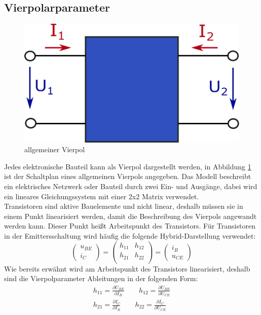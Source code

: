\documentclass[12pt,a4paper,ngerman]{report}
\begin{document}
		\subsection{Vierpolarparameter}
				\begin{figure}[h]
			\centering
			\includegraphics[width=7.5 cm]{plots/Vierpol.pdf}
			\caption{allgemeiner Vierpol}
			\label{img:Vierpol}
		\end{figure} 
		Jedes elektronische Bauteil kann als Vierpol dargestellt werden, in Abbildung \ref{img:Vierpol} ist der Schaltplan eines allgemeinen Vierpols angegeben. Das Modell beschreibt ein elektrisches Netzwerk oder Bauteil durch zwei Ein- und Ausgänge, dabei wird ein lineares Gleichungssystem mit einer 2x2 Matrix verwendet.\\
		Transistoren sind aktive Bauelemente und nicht linear, deshalb müssen sie in einem Punkt linearisiert werden, damit die Beschreibung des Vierpols angewandt werden kann. Dieser Punkt heißt Arbeitspunkt des Transistors. Für Transistoren in der Emittersschaltung wird häufig die folgende Hybrid-Darstellung verwendet:
		\begin{equation}
			\begin{pmatrix}
				u_{BE}\\
				i_C
			\end{pmatrix}
		=	\begin{pmatrix}
				h_{11} & h_{12}\\
				h_{21} & h_{22}\\
			\end{pmatrix}
		=	\begin{pmatrix}
				i_{B}\\
				u_{CE}
			\end{pmatrix}
		\end{equation}
		Wie bereits erwähnt wird am Arbeitspunkt des Transistors linearisiert, deshalb sind die Vierpolparameter Ableitungen in der folgenden Form:
		\begin{equation}
			\begin{split}
				h_{11} = \frac{\partial U_{BE}}{\partial I_{B}} \qquad h_{12} = \frac{\partial U_{BE}}{\partial U_{CE}}\\
				h_{21} = \frac{\partial I_{C}}{\partial I_{B}} \qquad h_{22} = \frac{\partial I_{C}}{\partial U_{CE}}\\
			\end{split}
		\end{equation}
\end{document}
